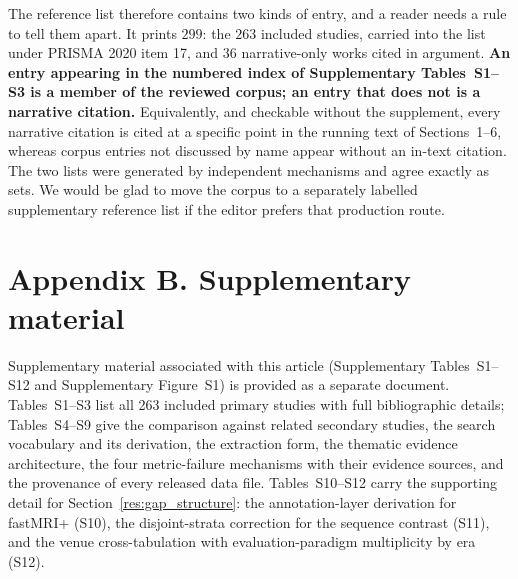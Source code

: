 \documentclass[review,authoryear]{elsarticle}
\begin{document}
The reference list therefore contains two kinds of entry, and a reader needs a rule to tell
them apart. It prints $299$: the $263$ included studies, carried into the list under PRISMA
2020 item 17, and $36$ narrative-only works cited in argument. \textbf{An entry appearing in
the numbered index of Supplementary Tables~S1--S3 is a member of the reviewed corpus; an
entry that does not is a narrative citation.} Equivalently, and checkable without the
supplement, every narrative citation is cited at a specific point in the running text of
Sections~1--6, whereas corpus entries not discussed by name appear without an in-text
citation. The two lists were generated by independent mechanisms and agree exactly as sets.
We would be glad to move the corpus to a separately labelled supplementary reference list
if the editor prefers that production route.

\section*{Appendix B. Supplementary material}
Supplementary material associated with this article (Supplementary Tables~S1--S12 and
Supplementary Figure~S1) is provided as a separate document. Tables~S1--S3 list all
263 included primary studies with full bibliographic details; Tables~S4--S9 give the
comparison against related secondary studies, the search vocabulary and its derivation,
the extraction form, the thematic evidence architecture, the four metric-failure
mechanisms with their evidence sources, and the provenance of every released data file.
Tables~S10--S12 carry the supporting detail for Section~\ref{res:gap_structure}:
the annotation-layer derivation for fastMRI+ (S10), the disjoint-strata correction for
the sequence contrast (S11), and the venue cross-tabulation with evaluation-paradigm
multiplicity by era (S12).
\end{document}
